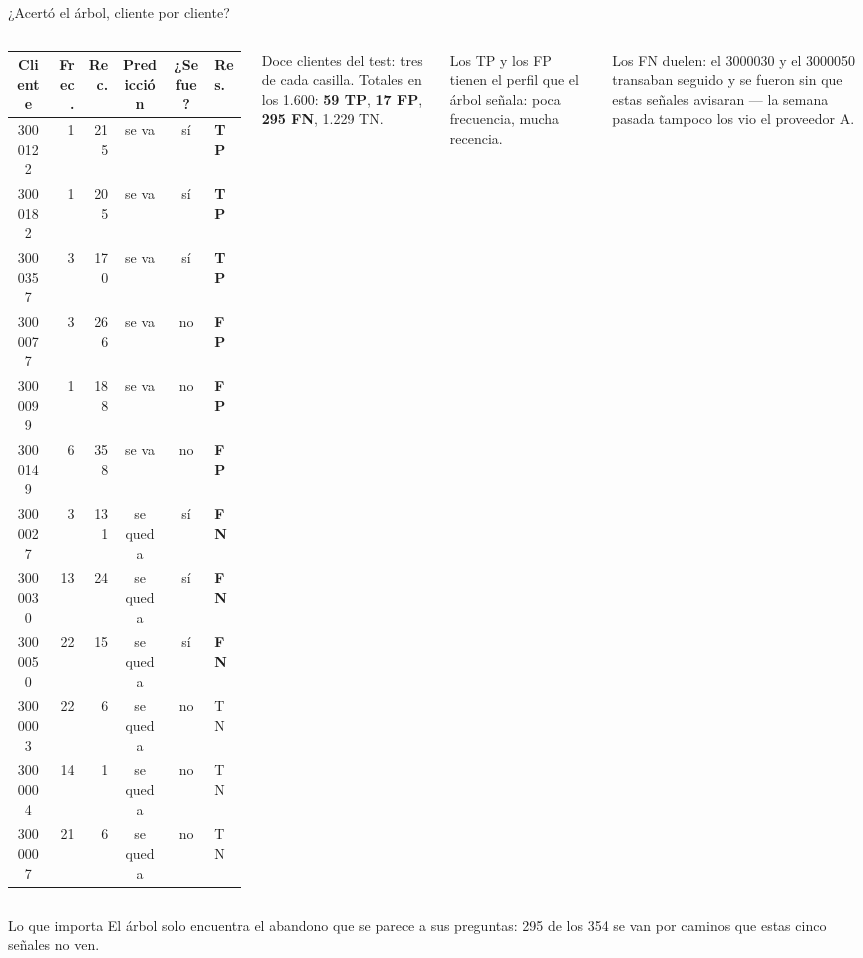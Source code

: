 \documentclass{beamer}
\begin{document}
\begin{frame}{¿Acertó el árbol, cliente por cliente?}
\small
\begin{columns}[T]
\centering
\scriptsize
\setlength{\tabcolsep}{3pt}
\begin{tabular}{@{}c r r c c l@{}}
\toprule
\textbf{Cliente} & \textbf{Frec.} & \textbf{Rec.} & \textbf{Predicción} & \textbf{¿Se fue?} & \textbf{Res.} \\
\midrule
\rowcolor{grisclaro} 3000122 & 1 & 215 & se va & sí & \textbf{TP} \\
\rowcolor{grisclaro} 3000182 & 1 & 205 & se va & sí & \textbf{TP} \\
\rowcolor{grisclaro} 3000357 & 3 & 170 & se va & sí & \textbf{TP} \\
3000077 & 3 & 266 & se va & no & \textbf{FP} \\
3000099 & 1 & 188 & se va & no & \textbf{FP} \\
3000149 & 6 & 358 & se va & no & \textbf{FP} \\
\rowcolor{grisclaro} 3000027 & 3 & 131 & se queda & sí & \textbf{FN} \\
\rowcolor{grisclaro} 3000030 & 13 & 24 & se queda & sí & \textbf{FN} \\
\rowcolor{grisclaro} 3000050 & 22 & 15 & se queda & sí & \textbf{FN} \\
3000003 & 22 & 6 & se queda & no & TN \\
3000004 & 14 & 1 & se queda & no & TN \\
3000007 & 21 & 6 & se queda & no & TN \\
\bottomrule
\end{tabular}

\vspace{0.05cm}
\tiny Doce clientes del test: tres de cada casilla.
\footnotesize
Totales en los 1.600: \textbf{59 TP}, \textbf{17 FP}, \textbf{295 FN}, 1.229 TN.

\vspace{0.12cm}
Los TP y los FP tienen el perfil que el árbol señala: poca frecuencia, mucha recencia.

\vspace{0.12cm}
Los FN duelen: el 3000030 y el 3000050 transaban seguido y se fueron sin que estas señales avisaran --- la semana pasada tampoco los vio el proveedor A.
\end{columns}
\pause
\vspace{0.1cm}
\begin{alertblock}{Lo que importa}
El árbol solo encuentra el abandono que se parece a sus preguntas: 295 de los 354 se van por caminos que estas cinco señales no ven.
\end{alertblock}
\end{frame}
\end{document}
